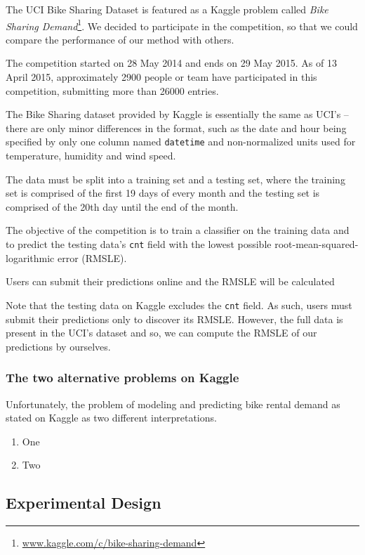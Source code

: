 \documentclass[12pt]{article}
\begin{document}
The UCI Bike Sharing Dataset is featured as a Kaggle problem called \emph{Bike Sharing Demand}\footnote{\url{www.kaggle.com/c/bike-sharing-demand}}. We decided to participate in the competition, so that we could compare the performance of our method with others.

The competition started on 28 May 2014 and ends on 29 May 2015. As of 13 April 2015, approximately 2900 people or team have participated in this competition, submitting more than 26000 entries.

The Bike Sharing dataset provided by Kaggle is essentially the same as UCI's -- there are only minor differences in the format, such as the date and hour being specified by only one column named \texttt{datetime} and non-normalized units used for temperature, humidity and wind speed.

The data must be split into a training set and a testing set, where the training set is comprised of the first 19 days of every month and the testing set is comprised of the 20th day until the end of the month.

The objective of the competition is to train a classifier on the training data and to predict the testing data's \texttt{cnt} field with the lowest possible root-mean-squared-logarithmic error (RMSLE).

Users can submit their predictions online and the RMSLE will be calculated

Note that the testing data on Kaggle excludes the \texttt{cnt} field. As such, users must submit their predictions only to discover its RMSLE. However, the full data is present in the UCI's dataset and so, we can compute the RMSLE of our predictions by ourselves.


\subsubsection{The two alternative problems on Kaggle}

Unfortunately, the problem of modeling and predicting bike rental demand as stated on Kaggle as two different interpretations.

\begin{enumerate}
	\item One
	\item Two
\end{enumerate}

\subsection{Experimental Design}
\end{document}
